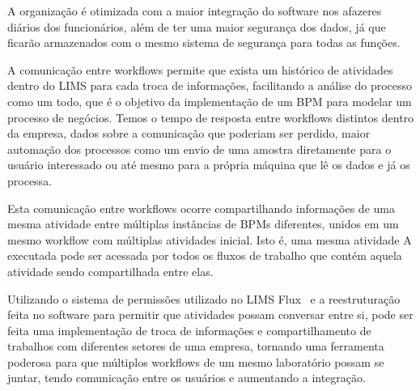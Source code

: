 A organização é otimizada com a maior integração do software nos afazeres diários dos funcionários, além de ter uma maior segurança dos dados, já que ficarão armazenados com o mesmo sistema de segurança para todas as funções.


A comunicação entre workflows permite que exista um histórico de atividades dentro do LIMS para cada troca de informações, facilitando a análise do processo como um todo, que é o objetivo da implementação de um BPM para modelar um processo de negócios. Temos o tempo de resposta entre workflows distintos dentro da empresa, dados sobre a comunicação que poderiam ser perdido, maior automação dos processos como um envio de uma amostra diretamente para o usuário interessado ou até mesmo para a própria máquina que lê os dados e já os processa.

Esta comunicação entre workflows ocorre compartilhando informações de uma mesma atividade entre múltiplas instâncias de BPMs diferentes, unidos em um mesmo workflow com múltiplas atividades inicial. Isto é, uma mesma atividade A executada pode ser acessada por todos os fluxos de trabalho que contém aquela atividade sendo compartilhada entre elas.

Utilizando o sistema de permissões utilizado no LIMS Flux~\cite{LucasAugustoFerreiraHanke2014DesenvolvimentoWorkflows} e a reestruturação feita no software para permitir que atividades possam conversar entre si, pode ser feita uma implementação de troca de informações e compartilhamento de trabalhos com diferentes setores de uma empresa, tornando uma ferramenta poderosa para que múltiplos workflows de um mesmo laboratório possam se juntar, tendo comunicação entre os usuários e aumentando a integração.